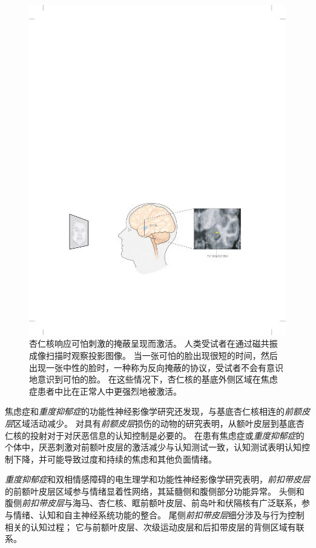\begin{figure}[htbp]
	\centering
	\includegraphics[width=0.95\linewidth]{chap61/fig_61_3}
	\caption{杏仁核响应可怕刺激的掩蔽呈现而激活。
		人类受试者在通过磁共振成像扫描时观察投影图像。
		当一张可怕的脸出现很短的时间，然后出现一张中性的脸时，一种称为反向掩蔽的协议，受试者不会有意识地意识到可怕的脸。
		在这些情况下，杏仁核的基底外侧区域在焦虑症患者中比在正常人中更强烈地被激活\cite{etkin2004individual}。}
	\label{fig:61_3}
\end{figure}


焦虑症和\textit{重度抑郁症}的功能性神经影像学研究还发现，与基底杏仁核相连的\textit{前额皮层}区域活动减少。
对具有\textit{前额皮层}损伤的动物的研究表明，从额叶皮层到基底杏仁核的投射对于对厌恶信息的认知控制是必要的。
在患有焦虑症或\textit{重度抑郁症}的个体中，厌恶刺激对前额叶皮层的激活减少与认知测试一致，认知测试表明认知控制下降，并可能导致过度和持续的焦虑和其他负面情绪。


\textit{重度抑郁症}和双相情感障碍的电生理学和功能性神经影像学研究表明，\textit{前扣带皮层}的前额叶皮层区域参与情绪显着性网络，其延髓侧和腹侧部分功能异常。
头侧和腹侧\textit{前扣带皮层}与海马、杏仁核、眶前额叶皮层、前岛叶和伏隔核有广泛联系，参与情绪、认知和自主神经系统功能的整合。
尾侧\textit{前扣带皮层}细分涉及与行为控制相关的认知过程；
它与前额叶皮层、次级运动皮层和后扣带皮层的背侧区域有联系。


